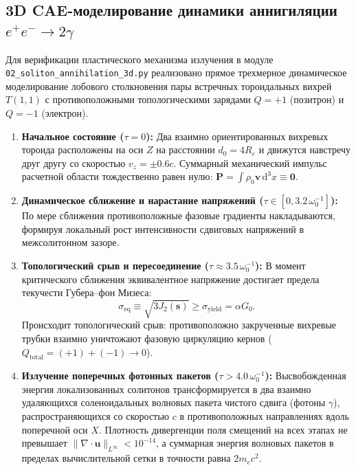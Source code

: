 \documentclass[11pt,a4paper]{article}
\theoremstyle{definition}
\theoremstyle{remark}
\begin{document}
\subsection{3D CAE-моделирование динамики аннигиляции $e^+e^- \to 2\gamma$}
Для верификации пластического механизма излучения в модуле \texttt{02\_soliton\_annihilation\_3d.py} реализовано прямое трехмерное динамическое моделирование лобового столкновения пары встречных тороидальных вихрей $T(1,1)$ с противоположными топологическими зарядами $Q = +1$ (позитрон) и $Q = -1$ (электрон).

\begin{enumerate}
    \item \textbf{Начальное состояние ($\tau = 0$):} Два взаимно ориентированных вихревых тороида расположены на оси $Z$ на расстоянии $d_0 = 4 R_e$ и движутся навстречу друг другу со скоростью $v_z = \pm 0.6 c$. Суммарный механический импульс расчетной области тождественно равен нулю: $\mathbf{P} = \int \rho_0 \mathbf{v} \, \mathrm{d}^3 x \equiv \mathbf{0}$.
    
    \item \textbf{Динамическое сближение и нарастание напряжений ($\tau \in [0, 3.2 \, \omega_0^{-1}]$):} По мере сближения противоположные фазовые градиенты накладываются, формируя локальный рост интенсивности сдвиговых напряжений в межсолитонном зазоре.
    
    \item \textbf{Топологический срыв и пересоединение ($\tau \approx 3.5 \, \omega_0^{-1}$):} В момент критического сближения эквивалентное напряжение достигает предела текучести Губера--фон Мизеса:
    \begin{equation}
        \sigma_{\mathrm{eq}} \equiv \sqrt{3 J_2(\mathbf{s})} \ge \sigma_{\mathrm{yield}} = \alpha G_0.
    \end{equation}
    Происходит топологический срыв: противоположно закрученные вихревые трубки взаимно уничтожают фазовую циркуляцию кернов ($Q_{\mathrm{total}} = (+1) + (-1) \to 0$).
    
    \item \textbf{Излучение поперечных фотонных пакетов ($\tau > 4.0 \, \omega_0^{-1}$):} Высвобожденная энергия локализованных солитонов трансформируется в два взаимно удаляющихся соленоидальных волновых пакета чистого сдвига (фотоны $\gamma$), распространяющихся со скоростью $c$ в противоположных направлениях вдоль поперечной оси $X$. Плотность дивергенции поля смещений на всех этапах не превышает $\|\nabla \cdot \mathbf{u}\|_{L^\infty} < 10^{-14}$, а суммарная энергия волновых пакетов в пределах вычислительной сетки в точности равна $2 m_e c^2$.
\end{enumerate}
\end{document}
